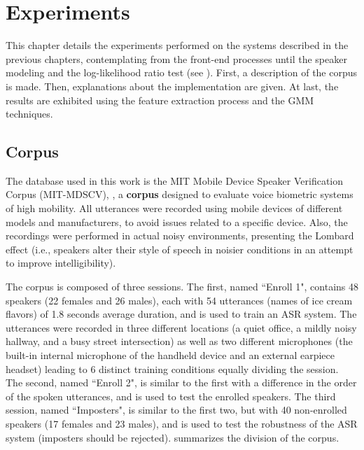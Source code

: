 \chapter{Experiments}
\label{ch:experiments}

This chapter details the experiments performed on the systems described in the previous chapters, contemplating from the front-end processes until the speaker modeling and the log-likelihood ratio test (see ). First, a description of the corpus is made. Then, explanations about the implementation are given. At last, the results are exhibited using the feature extraction process and the GMM techniques.

\section{Corpus}
\label{sec:corpus}

The database used in this work is the MIT Mobile Device Speaker Verification Corpus (MIT-MDSCV), , a \textbf{corpus} designed to evaluate voice biometric systems of high mobility. All utterances were recorded using mobile devices of different models and manufacturers, to avoid issues related to a specific device. Also, the recordings were performed in actual noisy environments, presenting the Lombard effect (i.e., speakers alter their style of speech in noisier conditions in an attempt to improve intelligibility).

The corpus is composed of three sessions. The first, named ``Enroll 1", contains 48 speakers (22 females and 26 males), each with 54 utterances (names of ice cream flavors) of 1.8 seconds average duration, and is used to train an ASR system. The utterances were recorded in three different locations (a quiet office, a mildly noisy hallway, and a busy street intersection) as well as two different microphones (the built-in internal microphone of the handheld device and an external earpiece headset) leading to 6 distinct training conditions equally dividing the session. The second, named ``Enroll 2", is similar to the first with a difference in the order of the spoken utterances, and is used to test the enrolled speakers. The third session, named ``Imposters", is similar to the first two, but with 40 non-enrolled speakers (17 females and 23 males), and is used to test the robustness of the ASR system (imposters should be rejected).  summarizes the division of the corpus.

